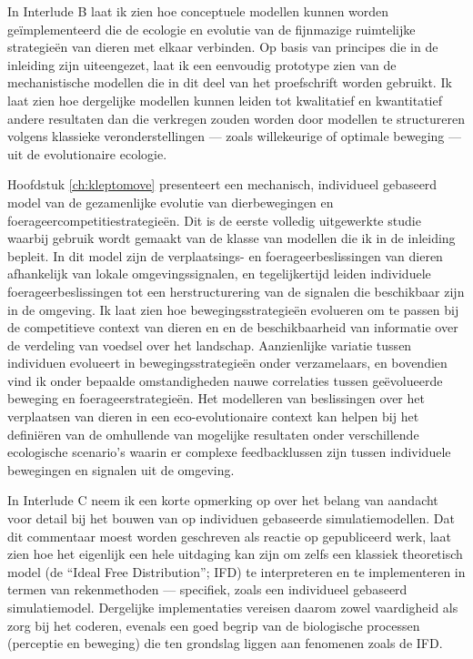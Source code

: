 In Interlude B laat ik zien hoe conceptuele modellen kunnen worden ge{\"i}mplementeerd die de ecologie en evolutie van de fijnmazige ruimtelijke strategie{\"e}n van dieren met elkaar verbinden. Op basis van principes die in de inleiding zijn uiteengezet, laat ik een eenvoudig prototype zien van de mechanistische modellen die in dit deel van het proefschrift worden gebruikt. Ik laat zien hoe dergelijke modellen kunnen leiden tot kwalitatief en kwantitatief andere resultaten dan die verkregen zouden worden door modellen te structureren volgens klassieke veronderstellingen --- zoals willekeurige of optimale beweging --- uit de evolutionaire ecologie.

Hoofdstuk \ref{ch:kleptomove} presenteert een mechanisch, individueel gebaseerd model van de gezamenlijke evolutie van dierbewegingen en foerageercompetitiestrategie{\"e}n.
Dit is de eerste volledig uitgewerkte studie waarbij gebruik wordt gemaakt van de klasse van modellen die ik in de inleiding bepleit. In dit model zijn de verplaatsings- en foerageerbeslissingen van dieren afhankelijk van lokale omgevingssignalen, en tegelijkertijd leiden individuele foerageerbeslissingen tot een herstructurering van de signalen die beschikbaar zijn in de omgeving. Ik laat zien hoe bewegingsstrategie{\"e}n evolueren om te passen bij de competitieve context van dieren en en de beschikbaarheid van informatie over de verdeling van voedsel over het landschap. Aanzienlijke variatie tussen individuen evolueert in bewegingsstrategie{\"e}n onder verzamelaars, en bovendien vind ik onder bepaalde omstandigheden nauwe correlaties tussen ge{\"e}volueerde beweging en foerageerstrategie{\"e}n. Het modelleren van beslissingen over het verplaatsen van dieren in een eco-evolutionaire context kan helpen bij het defini{\"e}ren van de omhullende van mogelijke resultaten onder verschillende ecologische scenario's waarin er complexe feedbacklussen zijn tussen individuele bewegingen en signalen uit de omgeving.

In Interlude C neem ik een korte opmerking op over het belang van aandacht voor detail bij het bouwen van op individuen gebaseerde simulatiemodellen. Dat dit commentaar moest worden geschreven als reactie op gepubliceerd werk, laat zien hoe het eigenlijk een hele uitdaging kan zijn om zelfs een klassiek theoretisch model (de ``Ideal Free Distribution''; IFD) te interpreteren en te implementeren in termen van rekenmethoden --- specifiek, zoals een individueel gebaseerd simulatiemodel. Dergelijke implementaties vereisen daarom zowel vaardigheid als zorg bij het coderen, evenals een goed begrip van de biologische processen (perceptie en beweging) die ten grondslag liggen aan fenomenen zoals de IFD.

